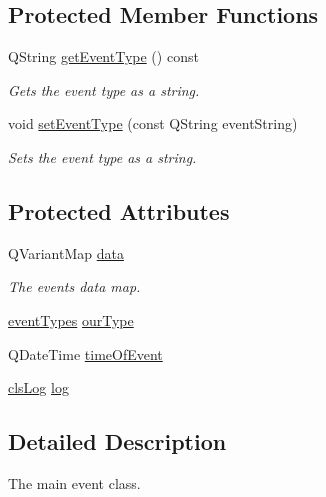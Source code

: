 \subsection*{Protected Member Functions}
\begin{DoxyCompactItemize}
\item 
Q\-String \hyperlink{classshared_1_1events_1_1cls_event_abd4a458aec7673de426a8995a349bf4b}{get\-Event\-Type} () const 
\begin{DoxyCompactList}\small\item\em Gets the event type as a string. \end{DoxyCompactList}\item 
void \hyperlink{classshared_1_1events_1_1cls_event_a488bd12dc62687ddfcbe89e3bba094c6}{set\-Event\-Type} (const Q\-String event\-String)
\begin{DoxyCompactList}\small\item\em Sets the event type as a string. \end{DoxyCompactList}\end{DoxyCompactItemize}
\subsection*{Protected Attributes}
\begin{DoxyCompactItemize}
\item 
Q\-Variant\-Map \hyperlink{classshared_1_1events_1_1cls_event_a6cfb6b96d72fc1e7a101e61061ec2755}{data}
\begin{DoxyCompactList}\small\item\em The events data map. \end{DoxyCompactList}\item 
\hyperlink{namespaceshared_1_1events_a758b1a88b2eb1c9ef9388755f8869ad7}{event\-Types} \hyperlink{classshared_1_1events_1_1cls_event_a3d8dd58c9e974ab19c2de66b300c4c79}{our\-Type}
\item 
Q\-Date\-Time \hyperlink{classshared_1_1events_1_1cls_event_aecf9544cf664b22d6419275f1ad6bd9d}{time\-Of\-Event}
\item 
\hyperlink{class_k4_u_1_1cls_log}{cls\-Log} \hyperlink{classshared_1_1events_1_1cls_event_ac7f241779485316bf8a6016ee35d21db}{log}
\end{DoxyCompactItemize}


\subsection{Detailed Description}
The main event class. 

